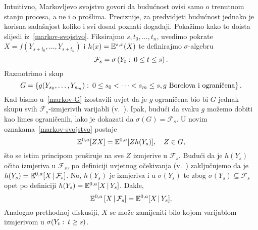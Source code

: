 \documentclass[main.tex]{subfiles}
\begin{document}
\begin{komentar}
	Intuitivno, Markovljevo svojstvo govori da budućnost ovisi samo o trenutnom stanju procesa, a ne i o prošlima. Preciznije, za predvidjeti budućnost jednako je korisna
	sadašnjost koliko i svi dosad poznati događaji. Pokažimo kako to doista slijedi iz~\eqref{markov-svojstvo}. Fiksirajmo \( s, t_0, \ldots, t_n \), uvedimo
	pokrate \( X = f\left(Y_{s+t_0},\ldots,Y_{s+t_n}\right) \) i \( h(x) = \mathbb{E}^{s,x}(X)  \) te definirajmo \( \sigma \)-algebru
	\[
		\mathcal F_s = \sigma \left( Y_t \, \colon \, 0 \le t \le s \right).
	\]
	Razmotrimo i skup
	\begin{equation} \label{markov-G}
		G = \left\{ g(Y_{s_0},\ldots,Y_{s_m}) \, \colon \, 0 \le s_0 < \cdots < s_m \le s, g \mathrm{\ Borelova \ i \ ograni\check cena} \right\}.
	\end{equation}
	Kad bismo u~\eqref{markov-G} izostavili uvjet da je \( g \) ograničena bio bi \( G \) jednak skupu svih \( \mathcal F_s \)-izmjerivih varijabli (v.~\cite[tm.~8.6]{sarapa}).
	Ipak, budući da svaku \( g \) možemo dobiti kao limes ograničenih, lako je dokazati da \( \sigma(G) = \mathcal F_s \). U novim oznakama~\eqref{markov-svojstvo}
	postaje
	\begin{equation}
		\mathbb{E}^{0,a}[ZX] = \mathbb{E}^{0,a}[Zh(Y_s)], \quad Z \in G,
	\end{equation}
	što se istim principom proširuje na sve \( Z \) izmjerive u \( \mathcal F_s \). Budući da je \( h(Y_s) \) očito izmjeriva u \( \mathcal F_s \), po definiciji uvjetnog očekivanja
	(v.~\cite[str.~579]{sarapa}) zaključujemo da je \( h(Y_s) = \mathbb{E}^{0,a}[X \, \vert \, \mathcal F_s] \). No, \( h(Y_s) \) je izmjeriva i u \( \sigma(Y_s) \) te zbog
	\( \sigma(Y_s) \subseteq \mathcal F_s \) opet po definiciji \( h(Y_s) = \mathbb{E}^{0,a}[X \, \vert \, Y_s] \). Dakle,
	\begin{equation}
		\mathbb{E}^{0,a}\left[ X \, \vert \, \mathcal F_s \right] = \mathbb{E}^{0,a}[X \, \vert \, Y_s].
	\end{equation}
	Analogno prethodnoj diskusiji, \( X \) se može zamijeniti bilo kojom varijablom izmjerivom u \( \sigma(Y_t \, \colon \, t \ge s) \).
\end{komentar}
\end{document}
